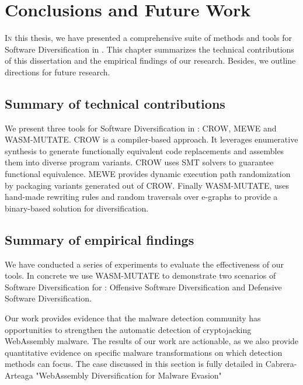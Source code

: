
\chapter{Conclusions and Future Work}
\label{results}



\lettrine[lines=4]{I}{n} this thesis, we have presented a comprehensive suite of methods and tools for Software Diversification in \Wasm.
This chapter summarizes the technical contributions of this dissertation and the empirical findings of our research.
Besides, we outline directions for future research.

\section{Summary of technical contributions}

We present three tools for Software Diversification in \Wasm: CROW, MEWE and WASM-MUTATE.
CROW is a compiler-based approach.
It leverages enumerative synthesis to generate functionally equivalent code replacements and assembles them into diverse \wasm program variants. 
CROW uses SMT solvers to guarantee functional equivalence.
MEWE provides dynamic execution path randomization by packaging variants generated out of CROW.
Finally WASM-MUTATE, uses hand-made rewriting rules and random traversals over e-graphs to provide a binary-based solution for \Wasm diversification.





\section{Summary of empirical findings}

We have conducted a series of experiments to evaluate the effectiveness of our tools.
In concrete we use WASM-MUTATE to demonstrate two scenarios of Software Diversification for \Wasm: Offensive Software Diversification and Defensive Software Diversification.

Our work provides evidence that the malware detection community has opportunities to strengthen the automatic detection of cryptojacking WebAssembly malware. 
The results of our work are actionable, as we also provide quantitative evidence on specific malware transformations on which detection methods can focus. 
The case discussed in this section is fully detailed in Cabrera-Arteaga \etal "WebAssembly Diversification for Malware Evasion"


